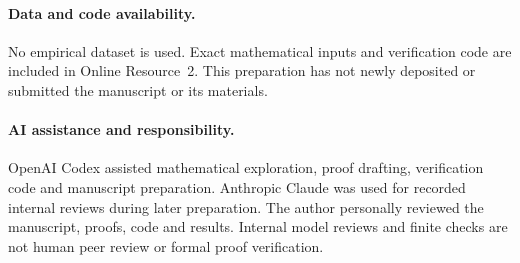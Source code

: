 \documentclass[11pt]{article}
\theoremstyle{remark}
\begin{document}
\paragraph{Data and code availability.}
No empirical dataset is used. Exact mathematical inputs and verification code
are included in Online Resource~2. This preparation has not newly deposited
or submitted the manuscript or its materials.
\paragraph{AI assistance and responsibility.}
OpenAI Codex assisted mathematical exploration, proof drafting, verification
code and manuscript preparation. Anthropic Claude was used for recorded
internal reviews during later preparation. The author personally reviewed
the manuscript, proofs, code and results. Internal model reviews and finite
checks are not human peer review or formal proof verification.
\end{document}
